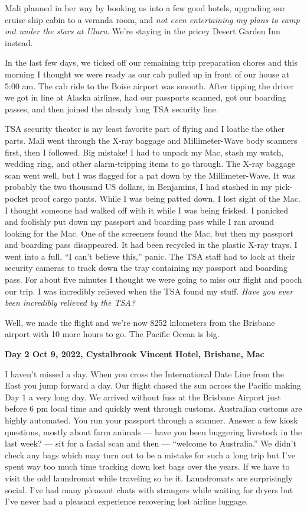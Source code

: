 Mali planned in her way by booking us into a few good hotels, upgrading
our cruise ship cabin to a veranda room, and \emph{not even entertaining
my plans to camp out under the stars at Uluru}. We're staying in the
pricey Desert Garden Inn instead.

In the last few days, we ticked off our remaining trip preparation
chores and this morning I thought we were ready as our cab pulled up in
front of our house at 5:00 am. The cab ride to the Boise airport was
smooth. After tipping the driver we got in line at Alaska airlines, had
our passports scanned, got our boarding passes, and then joined the
already long TSA security line.

TSA security theater is my least favorite part of flying and I loathe
the other parts. Mali went through the X-ray baggage and Millimeter-Wave
body scanners first, then I followed. Big mistake! I had to unpack my
Mac, stash my watch, wedding ring, and other alarm-tripping items to go
through. The X-ray baggage scan went well, but I was flagged for a pat
down by the Millimeter-Wave. It was probably the two thousand US
dollars, in Benjamins, I had stashed in my pick-pocket proof cargo
pants. While I was being patted down, I lost sight of the Mac. I thought
someone had walked off with it while I was being frisked. I panicked and
foolishly put down my passport and boarding pass while I ran around
looking for the Mac. One of the screeners found the Mac, but then my
passport and boarding pass disappeared. It had been recycled in the
plastic X-ray trays. I went into a full, ``I can't believe this,''
panic. The TSA staff had to look at their security cameras to track down
the tray containing my passport and boarding pass. For about five
minutes I thought we were going to miss our flight and pooch our trip. I
was incredibly relieved when the TSA found my stuff. \emph{Have you ever
been incredibly relieved by the TSA?}

Well, we made the flight and we're now 8252 kilometers from the Brisbane
airport with 10 more hours to go. The Pacific Ocean is big.


\textbf{Day 2 Oct 9, 2022, Cystalbrook Vincent Hotel, Brisbane, Mac}

I haven't missed a day. When you cross the International Date Line from
the East you jump forward a day. Our flight chased the sun across the
Pacific making Day 1 a very long day. We arrived without fuss at the
Brisbane Airport just before 6 pm local time and quickly went through
customs. Australian customs are highly automated. You run your passport
through a scanner. Answer a few kiosk questions, mostly about farm
animals --- have you been buggering livestock in the last week? --- sit
for a facial scan and then --- ``welcome to Australia.'' We didn't check
any bags which may turn out to be a mistake for such a long trip but
I've spent way too much time tracking down lost bags over the years. If
we have to visit the odd laundromat while traveling so be it.
Laundromats are surprisingly social. I've had many pleasant chats with
strangers while waiting for dryers but I've never had a pleasant
experience recovering lost airline luggage.

